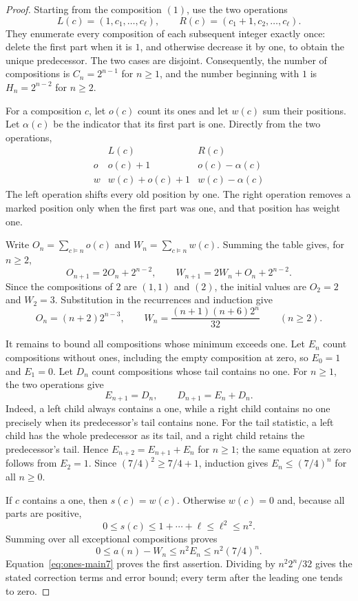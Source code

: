 \documentclass[11pt]{article}
\begin{document}
\begin{proof}
Starting from the composition $(1)$, use the two operations
\[
 L(c)=(1,c_1,\ldots,c_\ell),\qquad
 R(c)=(c_1+1,c_2,\ldots,c_\ell).
\]
They enumerate every composition of each subsequent integer exactly
once: delete the first part when it is $1$, and otherwise decrease it
by one, to obtain the unique predecessor. The two cases are disjoint.
Consequently, the number of compositions is $C_n=2^{n-1}$ for $n\ge1$,
and the number beginning with $1$ is $H_n=2^{n-2}$ for $n\ge2$.

For a composition $c$, let $o(c)$ count its ones and let $w(c)$ sum
their positions. Let $\alpha(c)$ be the indicator that its first part
is one. Directly from the two operations,
\[
\begin{array}{c|cc}
 & L(c)&R(c)\\ \hline
o & o(c)+1&o(c)-\alpha(c)\\
w & w(c)+o(c)+1&w(c)-\alpha(c)
\end{array}
\]
The left operation shifts every old position by one. The right operation
removes a marked position only when the first part was one, and that
position has weight one.

Write $O_n=\sum_{c\models n}o(c)$ and $W_n=\sum_{c\models n}w(c)$.
Summing the table gives, for $n\ge2$,
\[
 O_{n+1}=2O_n+2^{n-2},\qquad
 W_{n+1}=2W_n+O_n+2^{n-2}.
\]
Since the compositions of $2$ are $(1,1)$ and $(2)$, the initial values
are $O_2=2$ and $W_2=3$. Substitution in the recurrences and induction
give
\begin{equation}\label{eq:ones-main7}
 O_n=(n+2)2^{n-3},\qquad
 W_n=\frac{(n+1)(n+6)2^n}{32}\qquad(n\ge2).
\end{equation}

It remains to bound all compositions whose minimum exceeds one.
Let $E_n$ count compositions without ones, including the empty
composition at zero, so $E_0=1$ and $E_1=0$. Let $D_n$ count compositions
whose tail contains no one. For $n\ge1$, the two operations give
\[
 E_{n+1}=D_n,\qquad D_{n+1}=E_n+D_n.
\]
Indeed, a left child always contains a one, while a right child contains
no one precisely when its predecessor's tail contains none. For the
tail statistic, a left child has the whole predecessor as its tail,
and a right child retains the predecessor's tail. Hence
$E_{n+2}=E_{n+1}+E_n$ for $n\ge1$; the same equation at zero follows
from $E_2=1$. Since $(7/4)^2\ge7/4+1$, induction gives
$E_n\le(7/4)^n$ for all $n\ge0$.

If $c$ contains a one, then $s(c)=w(c)$. Otherwise $w(c)=0$ and,
because all parts are positive,
\[
 0\le s(c)\le1+\cdots+\ell\le\ell^2\le n^2.
\]
Summing over all exceptional compositions proves
\[
 0\le a(n)-W_n\le n^2E_n\le n^2(7/4)^n.
\]
Equation~\eqref{eq:ones-main7} proves the first assertion. Dividing by
$n^2 2^n/32$ gives the stated correction terms and error bound; every
term after the leading one tends to zero.
\end{proof}
\end{document}
